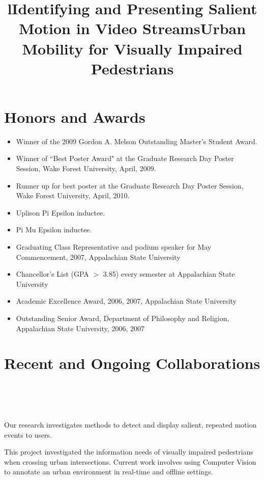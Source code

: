 \documentclass[overlapped,line,letterpaper]{res}
\begin{document}
\begin{resume}
\section{\bf Honors and Awards}
\begin{itemize}
\item Winner of the 2009 Gordon A. Melson Outstanding Master's Student Award.
\item Winner of ``Best Poster Award" at the Graduate Research Day Poster Session, Wake Forest University, April, 2009.
\item Runner up for best poster at the Graduate Research Day Poster Session, Wake Forest University, April, 2010.
\item Uplison Pi Epsilon inductee.
\item Pi Mu Epsilon inductee.
\item Graduating Class Representative and podium speaker for May Commencement, 2007, Appalachian State University
\item Chancellor's List (GPA $>$ 3.85) every semester at Appalachian State University
\item Academic Excellence Award, 2006, 2007, Appalachian State University
\item Outstanding Senior Award, Department of Philosophy and Religion, Appalachian State University, 2006, 2007
\end{itemize}

\section{\bf Recent and Ongoing Collaborations}
\begin{format}
\title{l}\\
\\
\body\\
\end{format}


\title{Identifying and Presenting Salient Motion in Video Streams}
\begin{position}
Our research investigates methods to detect and display salient, repeated motion events to users.
\end{position}


\title{Urban Mobility for Visually Impaired Pedestrians}
\begin{position}
This project investigated the information needs of visually impaired pedestrians when crossing urban intersections. Current work involves using Computer Vision to annotate an urban environment in real-time and offline settings.
\end{position}


\end{resume}
\end{document}
